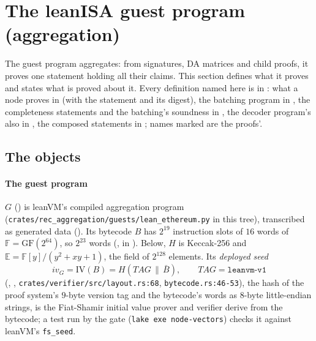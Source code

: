 \documentclass[11pt]{article}
\begin{document}
\section{The leanISA guest program (aggregation)}\label{sec:guest}

The guest program aggregates: from signatures, DA matrices and child proofs, it proves one statement
holding all their claims. This section defines what it proves and states what is proved about it.
Every definition named here is in : what a node proves in
 (with the statement and its digest), the batching program
in , the completeness statements and the batching's
soundness in , the decoder program's also in
, the composed statements in ; names
marked  are the proofs'.

\subsection{The objects}

\paragraph{The guest program} $G$ () is leanVM's compiled aggregation
program (\texttt{crates/rec\_aggregation/guests/lean\_ethereum.py} in this tree),
transcribed as generated data (). Its bytecode $B$ has $2^{19}$ instruction
slots of $16$ words of $\mathbb{F} = \mathrm{GF}(2^{64})$, so $2^{23}$ words
(, in ). Below, $H$ is Keccak-256 and
$\mathbb{E} = \mathbb{F}[y]/(y^2+xy+1)$, the field of $2^{128}$ elements. Its \emph{deployed seed}
\[
iv_G = \mathrm{IV}(B) = H(\mathit{TAG} \,\|\, \bar B), \qquad \mathit{TAG} = \texttt{leanvm-v1}
\]
(, , \texttt{crates/verifier/src/layout.rs:68},
\texttt{bytecode.rs:46-53}), the hash of the proof system's $9$-byte version tag and the bytecode's
words as $8$-byte little-endian strings, is the Fiat-Shamir initial value prover and verifier
derive from the bytecode; a test run by the gate (\texttt{lake exe node-vectors}) checks it against
leanVM's \texttt{fs\_seed}.
\end{document}
